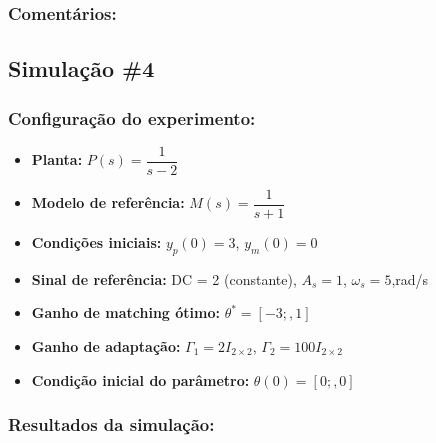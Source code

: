 \documentclass[10pt]{article}
\begin{document}
\subsubsection{Comentários:}

\subsection{Simulação \#4}
\subsubsection{Configuração do experimento:}
\begin{itemize}
\item \textbf{Planta:} $P(s) = \dfrac{1}{s - 2}$
\item \textbf{Modelo de referência:} $M(s) = \dfrac{1}{s + 1}$
\item \textbf{Condições iniciais:} $y_p(0)=3$, $y_m(0)=0$
\item \textbf{Sinal de referência:} DC = 2 (constante), $A_s=1$, $\omega_s=5$,rad/s
\item \textbf{Ganho de matching ótimo:} $\theta^* = [-3;,1]$
\item \textbf{Ganho de adaptação:} $\Gamma_1 = 2I_{2\times2}$, $\Gamma_2 = 100 I_{2\times2}$
\item \textbf{Condição inicial do parâmetro:} $\theta(0) = [0;,0]$
\end{itemize}

\subsubsection{Resultados da simulação:}
\end{document}

